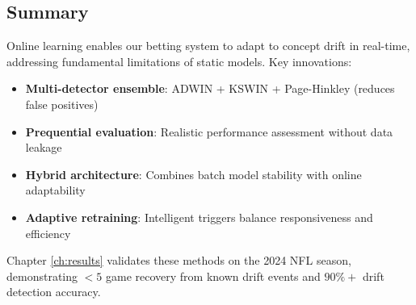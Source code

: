 \subsection{Summary}

Online learning enables our betting system to adapt to concept drift in real-time, addressing fundamental limitations of static models. Key innovations:

\begin{itemize}
    \item \textbf{Multi-detector ensemble}: ADWIN + KSWIN + Page-Hinkley (reduces false positives)
    \item \textbf{Prequential evaluation}: Realistic performance assessment without data leakage
    \item \textbf{Hybrid architecture}: Combines batch model stability with online adaptability
    \item \textbf{Adaptive retraining}: Intelligent triggers balance responsiveness and efficiency
\end{itemize}

Chapter \ref{ch:results} validates these methods on the 2024 NFL season, demonstrating $<5$ game recovery from known drift events and $90\%+$ drift detection accuracy.
